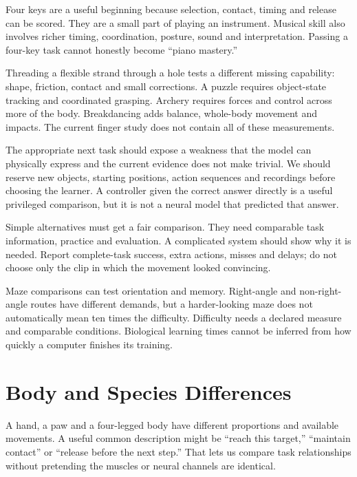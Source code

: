 Four keys are a useful beginning because selection, contact, timing and release can be scored. They are a small part of playing an instrument. Musical skill also involves richer timing, coordination, posture, sound and interpretation. Passing a four-key task cannot honestly become ``piano mastery.''\par

Threading a flexible strand through a hole tests a different missing capability: shape, friction, contact and small corrections. A puzzle requires object-state tracking and coordinated grasping. Archery requires forces and control across more of the body. Breakdancing adds balance, whole-body movement and impacts. The current finger study does not contain all of these measurements.\par

The appropriate next task should expose a weakness that the model can physically express and the current evidence does not make trivial. We should reserve new objects, starting positions, action sequences and recordings before choosing the learner. A controller given the correct answer directly is a useful privileged comparison, but it is not a neural model that predicted that answer.\par

Simple alternatives must get a fair comparison. They need comparable task information, practice and evaluation. A complicated system should show why it is needed. Report complete-task success, extra actions, misses and delays; do not choose only the clip in which the movement looked convincing.\par

Maze comparisons can test orientation and memory. Right-angle and non-right-angle routes have different demands, but a harder-looking maze does not automatically mean ten times the difficulty. Difficulty needs a declared measure and comparable conditions. Biological learning times cannot be inferred from how quickly a computer finishes its training.\par

\section{Body and Species Differences}

A hand, a paw and a four-legged body have different proportions and available movements. A useful common description might be ``reach this target,'' ``maintain contact'' or ``release before the next step.'' That lets us compare task relationships without pretending the muscles or neural channels are identical.\par

